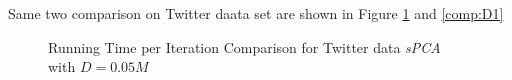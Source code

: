 \documentclass[12pt,notitlepage,oneside]{report}
\begin{document}
\newpage
Same two comparison on Twitter daata set are shown in Figure \ref{comp:N1} and \ref{comp:D1}
\begin{figure}[!htbp]
    \centering
    \caption{Running Time per Iteration Comparison for Twitter data \textit{sPCA} with  $D = 0.05M$}
    \label{comp:N1}
\end{figure}
\end{document}
